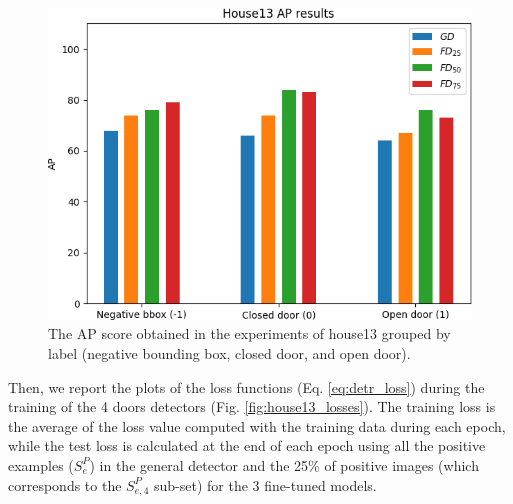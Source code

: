 \begin{figure}[h!]
	\centering
	\includegraphics[width=\linewidth]{images/house13_AP_results.png}
	\caption{The AP score obtained in the experiments of \textsf{house13} grouped by label (negative bounding box, closed door, and open door).}
	\label{fig:house13_AP_results}
\end{figure}

Then, we report the plots of the loss functions (Eq. \ref{eq:detr_loss}) during the training of the 4 doors detectors (Fig. \ref{fig:house13_losses}). The training loss is the average of the loss value computed with the training data during each epoch, while the test loss is calculated at the end of each epoch using all the positive examples ($S^{P}_e$) in the general detector and the 25\% of positive images (which corresponds to the $S^{P}_{e,4}$ sub-set) for the 3 fine-tuned models.

